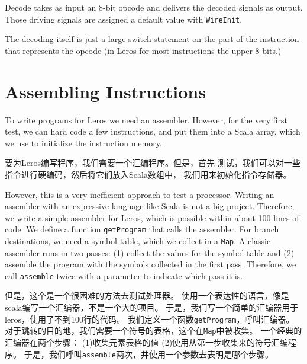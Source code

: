 \documentclass[%
    10pt,
    headinclude, footexclude,
    openright, %
    notitlepage,
    cleardoubleempty,
    headsepline,
    pointlessnumbers,
    bibtotoc, idxtotoc,
    ]{scrbook}
\newcommand{\code}[1]{{\small{\texttt{#1}}}}
\begin{document}
{

\noindent Decode takes as input an 8-bit opcode and delivers the decoded signals
as output. Those driving signals are assigned a default value with \code{WireInit}.


\noindent The decoding itself is just a large switch statement on the part of the
instruction that represents the opcode (in Leros for most instructions the upper
8 bits.)


\section{Assembling Instructions}

To write programs for Leros we need an assembler. However, for the very first
test, we can hard code a few instructions, and put them into a Scala array,
which we use to initialize the instruction memory.

要为Leros编写程序，我们需要一个汇编程序。但是，首先
测试，我们可以对一些指令进行硬编码，然后将它们放入Scala数组中，
我们用来初始化指令存储器。


\noindent However, this is a very inefficient approach to test a processor.
Writing an assembler with an expressive language like Scala is not a big project.
Therefore, we write a simple assembler for Leros, which is possible within about
100 lines of code. We define a function \code{getProgram} that calls the assembler.
For branch destinations, we need a symbol table, which we collect in a \code{Map}.
A classic assembler runs in two passes: (1) collect the values for the symbol table
and (2) assemble the program with the symbols collected in the first pass.
Therefore, we call \code{assemble} twice with a parameter to indicate which pass it is.

\noindent 但是，这个是一个很困难的方法去测试处理器。
使用一个表达性的语言，像是scala编写一个汇编器，不是一个大的项目。
于是，我们写一个简单的汇编器用于leros，使用了不到100行的代码。
我们定义一个函数\code{getProgram}，呼叫汇编器。
对于跳转的目的地，我们需要一个符号的表格，这个在\code{Map}中被收集。
一个经典的汇编器在两个步骤：
(1)收集元素表格的值
(2)使用从第一步收集来的符号汇编程序。
于是，我们呼叫\code{assemble}两次，并使用一个参数去表明是哪个步骤。


}
\end{document}
